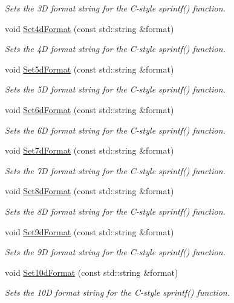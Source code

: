 \begin{DoxyCompactItemize}
\begin{DoxyCompactList}\small\item\em Sets the 3D format string for the C-\/style sprintf() function. \end{DoxyCompactList}\item 
void \hyperlink{classns3_1_1FileHelper_abcad864d71b39b46bce05c16f1047837}{Set4d\+Format} (const std\+::string \&format)
\begin{DoxyCompactList}\small\item\em Sets the 4D format string for the C-\/style sprintf() function. \end{DoxyCompactList}\item 
void \hyperlink{classns3_1_1FileHelper_a0e6cf5d569325b394b3b0eb1c81c23d8}{Set5d\+Format} (const std\+::string \&format)
\begin{DoxyCompactList}\small\item\em Sets the 5D format string for the C-\/style sprintf() function. \end{DoxyCompactList}\item 
void \hyperlink{classns3_1_1FileHelper_a56e1ff083c3c6f200a1e1342e7c29195}{Set6d\+Format} (const std\+::string \&format)
\begin{DoxyCompactList}\small\item\em Sets the 6D format string for the C-\/style sprintf() function. \end{DoxyCompactList}\item 
void \hyperlink{classns3_1_1FileHelper_ac1e796c5605065946db30fb668893485}{Set7d\+Format} (const std\+::string \&format)
\begin{DoxyCompactList}\small\item\em Sets the 7D format string for the C-\/style sprintf() function. \end{DoxyCompactList}\item 
void \hyperlink{classns3_1_1FileHelper_adb4c3c2186980bede3979209c035a534}{Set8d\+Format} (const std\+::string \&format)
\begin{DoxyCompactList}\small\item\em Sets the 8D format string for the C-\/style sprintf() function. \end{DoxyCompactList}\item 
void \hyperlink{classns3_1_1FileHelper_afd5b54b9a0d80637db63682514d8082f}{Set9d\+Format} (const std\+::string \&format)
\begin{DoxyCompactList}\small\item\em Sets the 9D format string for the C-\/style sprintf() function. \end{DoxyCompactList}\item 
void \hyperlink{classns3_1_1FileHelper_aef364fceb883c37051f06d07768d58b9}{Set10d\+Format} (const std\+::string \&format)
\begin{DoxyCompactList}\small\item\em Sets the 10D format string for the C-\/style sprintf() function. \end{DoxyCompactList}\end{DoxyCompactItemize}
